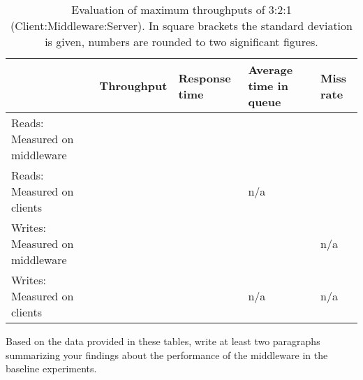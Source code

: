     \begin{table}
        \begin{tabular}{|l|p{2cm}|p{2cm}|p{2cm}|p{2cm}|}
            \hline                                & Throughput & Response time & Average time in queue & Miss rate \\ 
            \hline Reads: Measured on middleware  &            &               &                       &           \\ 
            \hline Reads: Measured on clients     &            &               & n/a                   &           \\ 
            \hline Writes: Measured on middleware &            &               &                       & n/a       \\ 
            \hline Writes: Measured on clients    &            &               & n/a                   & n/a       \\ 
            \hline 
        \end{tabular}
        \caption{Evaluation of maximum throughputs of 3:2:1 (Client:Middleware:Server). In square brackets the standard
                 deviation is given, numbers are rounded to two significant figures.\label{tab:32_throughput}}
    \end{table}

    Based on the data provided in these tables, write at least two paragraphs summarizing your findings about the performance of the middleware in the baseline experiments.
